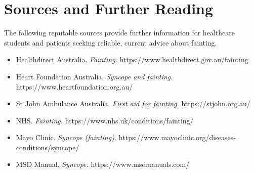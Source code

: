 \section*{Sources and Further Reading}
The following reputable sources provide further information for healthcare students and patients seeking reliable, current advice about fainting.
\begin{itemize}
    \item Healthdirect Australia. \textit{Fainting.} https://www.healthdirect.gov.au/fainting
    \item Heart Foundation Australia. \textit{Syncope and fainting.} https://www.heartfoundation.org.au/
    \item St John Ambulance Australia. \textit{First aid for fainting.} https://stjohn.org.au/
    \item NHS. \textit{Fainting.} https://www.nhs.uk/conditions/fainting/
    \item Mayo Clinic. \textit{Syncope (fainting).} https://www.mayoclinic.org/diseases-conditions/syncope/
    \item MSD Manual. \textit{Syncope.} https://www.msdmanuals.com/
\end{itemize}
